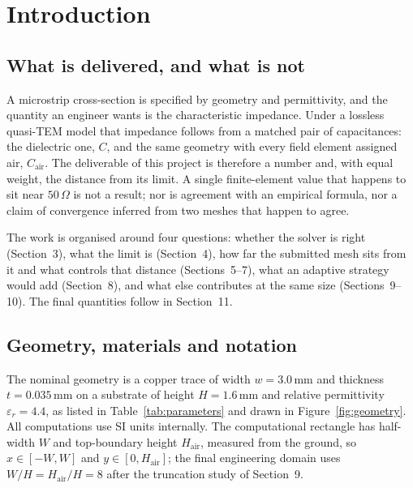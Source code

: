 \documentclass[11pt]{article}
\newcommand{\epsr}{\varepsilon_r}
\newcommand{\Cair}{C_{\mathrm{air}}}   %
\begin{document}
\section{Introduction}
\subsection{What is delivered, and what is not}
A microstrip cross-section is specified by geometry and permittivity, and the quantity an
engineer wants is the characteristic impedance. Under a lossless quasi-TEM model that
impedance follows from a matched pair of capacitances: the dielectric one, $C$, and the
same geometry with every field element assigned air, $\Cair$. The deliverable of this
project is therefore a number and, with equal weight, the distance from its limit. A
single finite-element value that happens to sit near $50\,\Omega$ is not a result; nor is
agreement with an empirical formula, nor a claim of convergence inferred from two meshes
that happen to agree.

The work is organised around four questions: whether the solver is right (Section~3), what
the limit is (Section~4), how far the submitted mesh sits from it and what controls that
distance (Sections~5--7), what an adaptive strategy would add (Section~8), and what else
contributes at the same size (Sections~9--10). The final quantities follow in Section~11.

\subsection{Geometry, materials and notation}
The nominal geometry is a copper trace of width $w=3.0\,\mathrm{mm}$ and thickness
$t=0.035\,\mathrm{mm}$ on a substrate of height $H=1.6\,\mathrm{mm}$ and relative
permittivity $\epsr=4.4$, as listed in Table~\ref{tab:parameters} and drawn in
Figure~\ref{fig:geometry}. All computations use SI units internally. The computational
rectangle has half-width $W$ and top-boundary height $H_{\mathrm{air}}$, measured from the
ground, so $x\in[-W,W]$ and $y\in[0,H_{\mathrm{air}}]$; the final engineering domain uses
$W/H=H_{\mathrm{air}}/H=8$ after the truncation study of Section~9.
\end{document}
